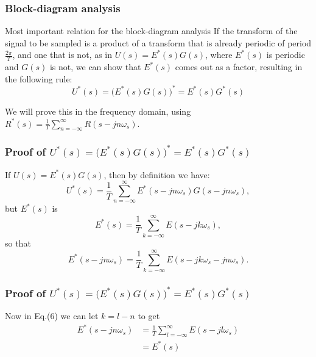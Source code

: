 \begin{frame}
	\frametitle{Block-diagram analysis}
	\begin{block}{Most important relation for the block-diagram analysis}
		If the transform of the signal to be sampled is a product of a transform that is already periodic of period $\frac{2\pi}{T}$, and one that is not, as in $U(s) = E^{*}(s)G(s)$, where $E^{*}(s)$ is periodic and $G(s)$ is not, we can show that $E^{*}(s)$ comes out as a factor, resulting in the following rule: 
		\begin{equation}
		U^{*}(s) = \big(E^{*}(s)G(s)\big)^{*} = E^{*}(s)G^{*}(s)
		\end{equation}
	\end{block}
	\vspace{1em}
	We will prove this in the frequency domain, using $R^*(s)=\frac{1}{T}\sum_{n=-\infty}^{\infty}R(s-jn\omega_s)$.\\
\end{frame}

\begin{frame}
	\frametitle{Proof of $U^{*}(s) = \big(E^{*}(s)G(s)\big)^{*} = E^{*}(s)G^{*}(s)$}
	If $U(s) = E^{*}(s)G(s)$, then by definition we have:
	\begin{equation}
	U^{*}(s) = \frac{1}{T} \sum_{n=-\infty}^{\infty} E^{*}(s - jn\omega_s)G(s - jn\omega_s),
	\end{equation}
	but $E^{*}(s)$ is
	\begin{equation}
	E^{*}(s) = \frac{1}{T} \sum_{k=-\infty}^{\infty} E(s-jk\omega_s),
	\end{equation}
	so that
	\begin{equation}
	E^{*}(s-jn\omega_s) = \frac{1}{T} \sum_{k=-\infty}^{\infty} E(s - jk\omega_s - jn\omega_s).
	\end{equation}
\end{frame}

\begin{frame}
	\frametitle{Proof of $U^{*}(s) = \big(E^{*}(s)G(s)\big)^{*} = E^{*}(s)G^{*}(s)$}
	Now in Eq.(6) we can let $k = l - n$ to get
	\begin{equation}
	\begin{split}
	E^{*}(s-jn\omega_s) &= \frac{1}{T} \sum_{l=-\infty}^{\infty} E(s - jl\omega_s)\\
	&= E^{*}(s)
	\end{split}
	\end{equation}
\end{frame}


